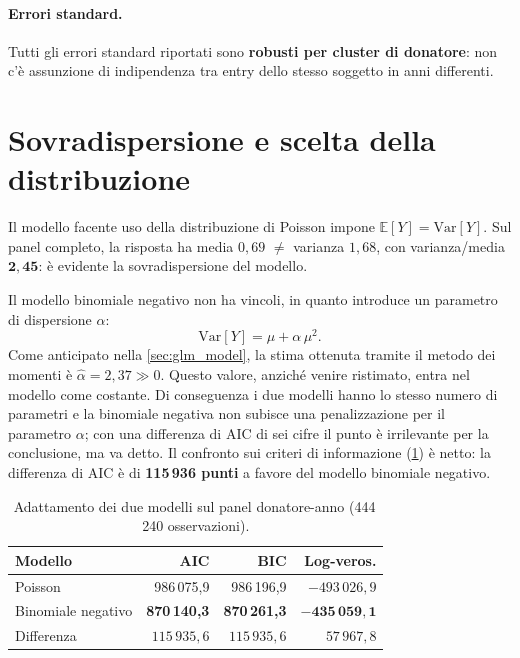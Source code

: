 \paragraph{Errori standard.}
Tutti gli errori standard riportati sono \textbf{robusti per cluster di
donatore}: non c'è assunzione di indipendenza tra entry dello stesso soggetto
in anni differenti.

\section{Sovradispersione e scelta della distribuzione}
\label{sec:glm_overdisp}

Il modello facente uso della distribuzione di Poisson impone 
$\mathbb{E}[Y] = \mathrm{Var}[Y]$. Sul panel
completo, la risposta ha media $0{,}69$ $\neq$ varianza $1{,}68$, con
varianza/media $\mathbf{2{,}45}$: è evidente la sovradispersione del modello.

Il modello binomiale negativo non ha vincoli, in quanto introduce un parametro di
dispersione $\alpha$:
\begin{equation}
    \mathrm{Var}[Y] = \mu + \alpha\,\mu^2 .
    \label{eq:nb_var}
\end{equation}
Come anticipato nella \cref{sec:glm_model}, la stima ottenuta tramite il metodo dei momenti
è $\hat{\alpha} = 2{,}37 \gg 0$.
Questo valore, anziché venire ristimato, entra nel
modello come costante. Di conseguenza i due
modelli hanno lo stesso numero di parametri e la binomiale negativa non
subisce una penalizzazione per il parametro $\alpha$; con una differenza di AIC di sei cifre il punto è
irrilevante per la conclusione, ma va detto. Il confronto sui criteri di informazione
(\cref{tab:glm_fit}) è netto: la differenza di AIC è di \textbf{115\,936 punti}
a favore del modello binomiale negativo.

\begin{table}[ht]
\centering
\caption{Adattamento dei due modelli sul panel donatore-anno (444\,240
osservazioni).}
\label{tab:glm_fit}
\begin{tabular}{@{}lrrr@{}}
\toprule
\textbf{Modello} & \textbf{AIC} & \textbf{BIC} & \textbf{Log-veros.} \\
\midrule
Poisson                   & 986\,075{,}9 & 986\,196{,}9 & $-493\,026{,}9$ \\
Binomiale negativo        & \textbf{870\,140{,}3} & \textbf{870\,261{,}3} & $\mathbf{-435\,059{,}1}$ \\
\midrule
Differenza                & $115\,935{,}6$ & $115\,935{,}6$ & $57\,967{,}8$ \\
\bottomrule
\end{tabular}
\end{table}

